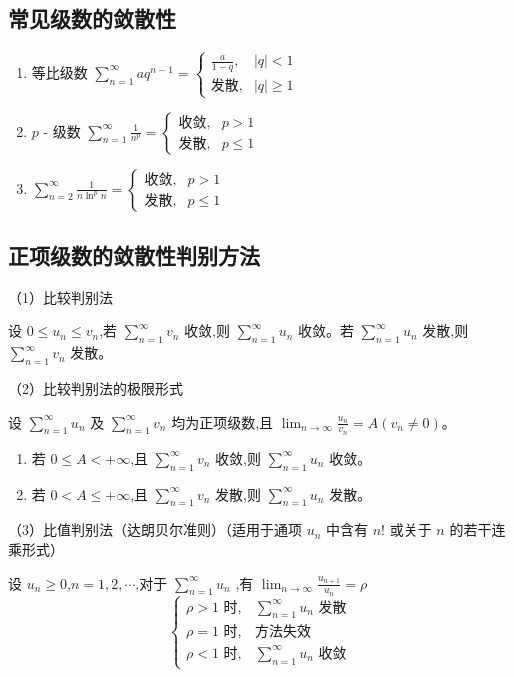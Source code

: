 \documentclass[UTF8]{ctexart}
\theoremstyle{remark}
\begin{document}
		\subsection{常见级数的敛散性}
		\begin{enumerate}
			\item 等比级数 \(\sum_{n = 1}^{\infty} aq^{n - 1}=
			\begin{cases}
				\frac{a}{1 - q}, & |q| < 1\\
				\text{发散}, & |q| \geq 1
			\end{cases}\)
			\item \(p\) - 级数 \(\sum_{n = 1}^{\infty} \frac{1}{n^{p}} = 
			\begin{cases}
				\text{收敛}, & p > 1\\
				\text{发散}, & p \leq 1
			\end{cases}\)
			\item \(\sum_{n = 2}^{\infty} \frac{1}{n\ln^{p}n}=
			\begin{cases}
				\text{收敛}, & p > 1\\
				\text{发散}, & p \leq 1
			\end{cases}\)
		\end{enumerate}
		
		\subsection{正项级数的敛散性判别方法}
		（1）比较判别法
		
		设 \(0\leq u_n\leq v_n\),若 \(\sum_{n = 1}^{\infty} v_n\) 收敛,则 \(\sum_{n = 1}^{\infty} u_n\) 收敛。若 \(\sum_{n = 1}^{\infty} u_n\) 发散,则 \(\sum_{n = 1}^{\infty} v_n\) 发散。
		
		（2）比较判别法的极限形式
		
		设 \(\sum_{n = 1}^{\infty} u_n\) 及 \(\sum_{n = 1}^{\infty} v_n\) 均为正项级数,且 \(\lim_{n \to \infty} \frac{u_n}{v_n}=A (v_n\neq0)\)。
		\begin{enumerate}
			\item 若 \(0\leq A<+\infty\),且 \(\sum_{n = 1}^{\infty} v_n\) 收敛,则 \(\sum_{n = 1}^{\infty} u_n\) 收敛。
			\item 若 \(0 < A\leq+\infty\),且 \(\sum_{n = 1}^{\infty} v_n\) 发散,则 \(\sum_{n = 1}^{\infty} u_n\) 发散。
		\end{enumerate}
		
		（3）比值判别法（达朗贝尔准则）（适用于通项 \(u_n\) 中含有 \(n!\) 或关于 \(n\) 的若干连乘形式）
		
		设 \(u_n\geq0\),\(n = 1, 2, \cdots\),对于 \(\sum_{n = 1}^{\infty} u_n\) ,有 \(\lim_{n \to \infty} \frac{u_{n + 1}}{u_n}=\rho\)
		\[
		\begin{cases}
			\rho>1\text{ 时}, & \sum_{n = 1}^{\infty} u_n\text{ 发散}\\
			\rho = 1\text{ 时}, & \text{方法失效}\\
			\rho<1\text{ 时}, & \sum_{n = 1}^{\infty} u_n\text{ 收敛}
		\end{cases}
		\]
		
\end{document}
